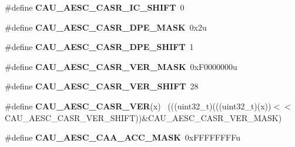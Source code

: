 \begin{DoxyCompactItemize}
\item 
\hypertarget{group___c_a_u___register___masks_ga6d38ea3ba55f1a1fdb7f01d217c387ed}{}\#define {\bfseries C\+A\+U\+\_\+\+A\+E\+S\+C\+\_\+\+C\+A\+S\+R\+\_\+\+I\+C\+\_\+\+S\+H\+I\+F\+T}~0\label{group___c_a_u___register___masks_ga6d38ea3ba55f1a1fdb7f01d217c387ed}

\item 
\hypertarget{group___c_a_u___register___masks_ga40583682054346f72ca37860de1406b6}{}\#define {\bfseries C\+A\+U\+\_\+\+A\+E\+S\+C\+\_\+\+C\+A\+S\+R\+\_\+\+D\+P\+E\+\_\+\+M\+A\+S\+K}~0x2u\label{group___c_a_u___register___masks_ga40583682054346f72ca37860de1406b6}

\item 
\hypertarget{group___c_a_u___register___masks_gaa13642832bf71bc8d76ef211ee7de360}{}\#define {\bfseries C\+A\+U\+\_\+\+A\+E\+S\+C\+\_\+\+C\+A\+S\+R\+\_\+\+D\+P\+E\+\_\+\+S\+H\+I\+F\+T}~1\label{group___c_a_u___register___masks_gaa13642832bf71bc8d76ef211ee7de360}

\item 
\hypertarget{group___c_a_u___register___masks_ga5439d1e52f7e2cd76ac43c3a82b251ac}{}\#define {\bfseries C\+A\+U\+\_\+\+A\+E\+S\+C\+\_\+\+C\+A\+S\+R\+\_\+\+V\+E\+R\+\_\+\+M\+A\+S\+K}~0x\+F0000000u\label{group___c_a_u___register___masks_ga5439d1e52f7e2cd76ac43c3a82b251ac}

\item 
\hypertarget{group___c_a_u___register___masks_ga14f13940abf0f6bc17f633206a387423}{}\#define {\bfseries C\+A\+U\+\_\+\+A\+E\+S\+C\+\_\+\+C\+A\+S\+R\+\_\+\+V\+E\+R\+\_\+\+S\+H\+I\+F\+T}~28\label{group___c_a_u___register___masks_ga14f13940abf0f6bc17f633206a387423}

\item 
\hypertarget{group___c_a_u___register___masks_gaef6e13833173606c05a613e4427ed4c8}{}\#define {\bfseries C\+A\+U\+\_\+\+A\+E\+S\+C\+\_\+\+C\+A\+S\+R\+\_\+\+V\+E\+R}(x)                                      ~(((uint32\+\_\+t)(((uint32\+\_\+t)(x))$<$$<$C\+A\+U\+\_\+\+A\+E\+S\+C\+\_\+\+C\+A\+S\+R\+\_\+\+V\+E\+R\+\_\+\+S\+H\+I\+F\+T))\&C\+A\+U\+\_\+\+A\+E\+S\+C\+\_\+\+C\+A\+S\+R\+\_\+\+V\+E\+R\+\_\+\+M\+A\+S\+K)\label{group___c_a_u___register___masks_gaef6e13833173606c05a613e4427ed4c8}

\item 
\hypertarget{group___c_a_u___register___masks_ga3c6971358e98de3e28c7d2602473a3d3}{}\#define {\bfseries C\+A\+U\+\_\+\+A\+E\+S\+C\+\_\+\+C\+A\+A\+\_\+\+A\+C\+C\+\_\+\+M\+A\+S\+K}~0x\+F\+F\+F\+F\+F\+F\+F\+Fu\label{group___c_a_u___register___masks_ga3c6971358e98de3e28c7d2602473a3d3}


\end{DoxyCompactItemize}
